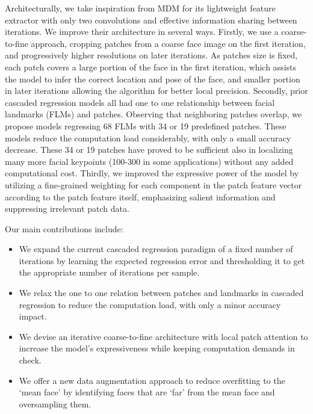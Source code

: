 \documentclass[9pt,twocolumn]{extarticle}
\begin{document}
Architecturally, we take inspiration from MDM \cite{trigeorgis2016mnemonic} for its lightweight feature extractor with only two convolutions and effective information sharing between iterations. We improve their architecture in several ways. Firstly, we use a coarse-to-fine approach, cropping patches from a coarse face image on the first iteration, and progressively higher resolutions on later iterations. As patches size is fixed, each patch covers a large portion of the face in the first iteration, which assists the model to infer the correct location and pose of the face, and smaller portion in later iterations allowing the algorithm for better local precision. Secondly, prior cascaded regression models all had one to one relationship between facial landmarks (FLMs) and patches. Observing that neighboring patches overlap, we propose models regressing 68 FLMs with 34 or 19 predefined patches. These models reduce the computation load considerably, with only a small accuracy decrease. These 34 or 19 patches have proved to be sufficient also in localizing many more facial keypoints (100-300 in some applications) without any added computational cost. Thirdly, we improved the expressive power of the model by utilizing a fine-grained weighting for each component in the patch feature vector according to the patch feature itself, emphasizing salient information and suppressing irrelevant patch data. 


Our main contributions include:
\begin{itemize}

    \item We expand the current cascaded regression paradigm of a fixed number of iterations by learning the expected regression error and thresholding it to get the appropriate number of iterations per sample.
    
    \item We relax the one to one relation between patches and landmarks in cascaded regression to reduce the computation load, with only a minor accuracy impact.
    
    \item We devise an iterative coarse-to-fine architecture with local patch attention to increase the model’s expressiveness while keeping computation demands in check.
    
    \item We offer a new data augmentation approach to reduce overfitting to the ‘mean face’ by identifying faces that are ‘far’ from the mean face and oversampling them. 
\end{itemize}
\end{document}
